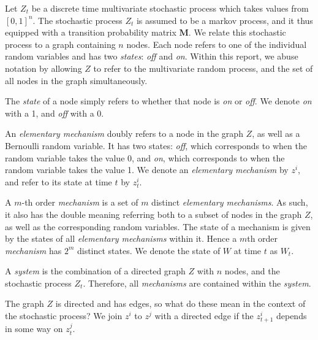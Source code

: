 Let $Z_t$ be a discrete time multivariate stochastic process which takes values from $[0,1]^n$.  The stochastic process $Z_t$ is assumed to be a markov process, and it thus equipped with a transition probability matrix $\mathbf{M}$. We relate this stochastic process to a graph containing $n$ nodes. Each node refers to one of the individual random variables and has two \textit{states}: \textit{off}  and \textit{on}. Within this report, we abuse notation by allowing $Z$ to refer to the multivariate random process, and the set of all nodes in the graph simultaneously. 

\begin{definition}
	The \textit{state} of a node simply refers to whether that node is \textit{on} or \textit{off}. We denote \textit{on} with a 1, and \textit{off} with a 0.
\end{definition}

\begin{definition}
	\label{def:element}
	An \textit{elementary mechanism} doubly refers to a node in the graph $Z$, as well as a Bernoulli random variable. It has two states: \textit{off}, which corresponds to when the random variable takes the value 0, and \textit{on}, which corresponds to when the random variable takes the value 1. We denote an \textit{elementary mechanism} by $z^i$, and refer to its state at time $t$ by $z^i_t$.
\end{definition}
	
\begin{definition}
	\label{def:mech}
	A $m$-th order \textit{mechanism} is a set of $m$ distinct \textit{elementary mechanisms}. As such, it also has the double meaning referring both to a subset of nodes in the graph $Z$, as well as the corresponding random variables. The state of a mechanism is given by the states of all \textit{elementary mechanisms} within it. Hence a $m$th order \textit{mechanism} has $2^m$ distinct states. We denote the state of $W$ at time $t$ as $W_t$.
\end{definition}

\begin{definition}
	\label{def:system}
	A \textit{system} is the combination of a directed graph $Z$ with $n$ nodes, and the stochastic process $Z_t$. Therefore, all \textit{mechanisms} are contained within the \textit{system}.
\end{definition}
	
The graph $Z$ is directed and has edges, so what do these mean in the context of the stochastic process? We join $z^i$ to $z^j$ with a directed edge if the $z^i_{t+1}$ depends in some way on $z^j_t$. 

